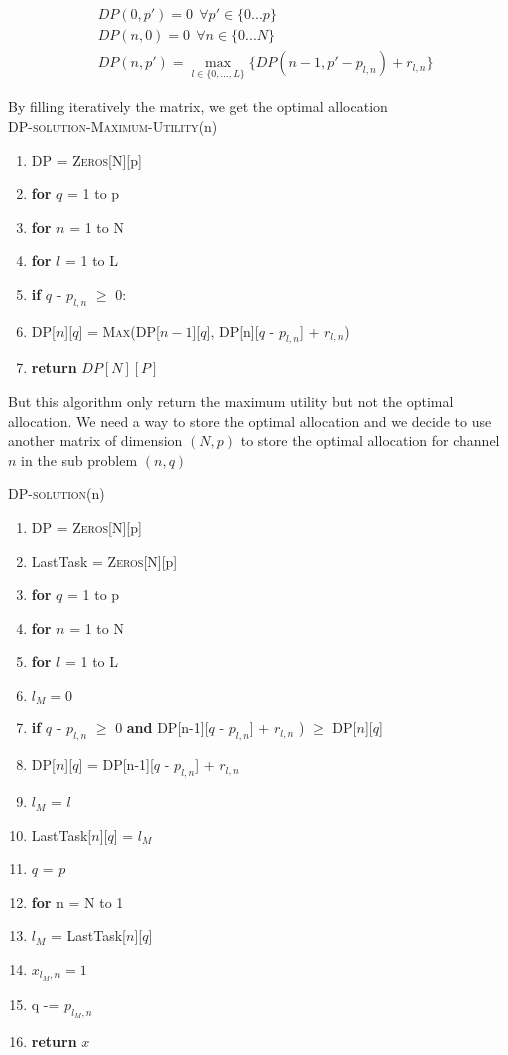 \documentclass[11pt, oneside]{report}
\begin{document}
\begin{align*}
&DP(0,p') = 0 \ \  \forall p'\in \{0...p\} \\
&DP(n,0) = 0\ \ \forall n\in \{0...N\} \\
&DP(n,p') =  \max_{l \in \{0,...,L\}} \{ DP(n-1, p'-p_{l,n}) + r_{l,n} \}
\end{align*}

By filling iteratively the matrix, we get the optimal allocation\\

\noindent\textsc{DP-solution-Maximum-Utility}(n)
\begin{enumerate}[1\ ]
\setlength{\topsep}{0.05ex}
\setlength{\itemsep}{0.05ex}
\item DP = \textsc{Zeros}[N][p]
\item \textbf{for} $q$ = 1 to p
\item \qquad \textbf{for} $n$ = 1 to N
\item \qquad \qquad \textbf{for} $l$ = 1 to L
\item \qquad \qquad \qquad \textbf{if} $q$ - $p_{l,n}$ $\geq$ 0:
\item \qquad \qquad \qquad \qquad DP[$n$][$q$] = \textsc{Max}(DP[$n-1$][$q$], DP[n][$q$ - $p_{l,n}$] + $r_{l,n}$)
\item \textbf{return} $DP[N][P]$
\end{enumerate}

But this algorithm only return the maximum utility but not the optimal allocation. We need a way to store the optimal allocation and we decide to use another matrix of dimension $(N,p)$ to store the optimal allocation for channel $n$ in the sub problem $(n,q)$

\noindent\textsc{DP-solution}(n)
\begin{enumerate}[1\ ]
\setlength{\topsep}{0.05ex}
\setlength{\itemsep}{0.05ex}
\item DP = \textsc{Zeros}[N][p]
\item LastTask = \textsc{Zeros}[N][p]
\item \textbf{for} $q$ = 1 to p
\item \qquad \textbf{for} $n$ = 1 to N
\item \qquad \qquad \textbf{for} $l$ = 1 to L
\item \qquad \qquad \qquad $l_M = 0$
\item \qquad \qquad \qquad \textbf{if} $q$ - $p_{l,n}$ $\geq$ 0 \textbf{and} DP[n-1][$q$ - $p_{l,n}$] + $r_{l,n}$ ) $\geq$ DP[$n$][$q$]
\item \qquad \qquad \qquad \qquad DP[$n$][$q$] = DP[n-1][$q$ - $p_{l,n}$] + $r_{l,n}$
\item \qquad \qquad \qquad \qquad $l_M$ = $l$
\item \qquad \qquad LastTask[$n$][$q$] = $l_M$
\item $q$ = $p$
\item \textbf{for} n = N to 1
\item \qquad $l_M$ = LastTask[$n$][$q$]
\item \qquad $x_{l_M, n} = 1$
\item \qquad q -= $p_{l_M, n}$
\item \textbf{return} $x$
\end{enumerate}
\end{document}
